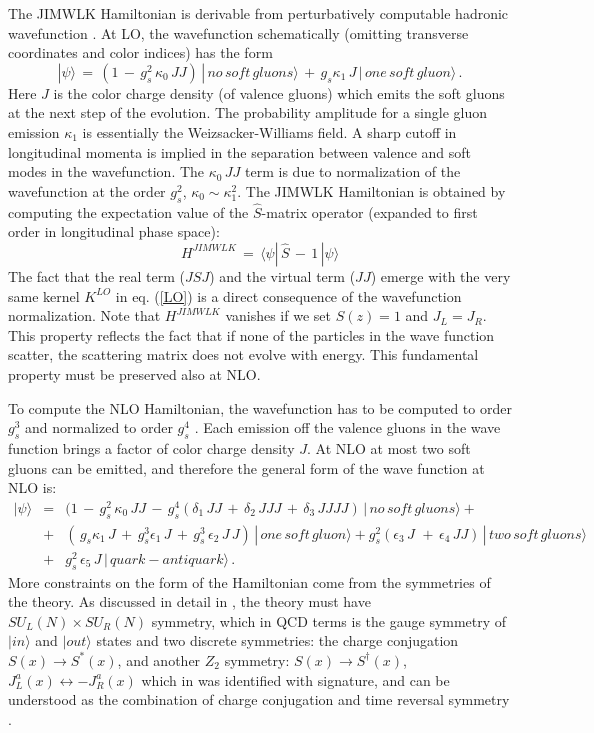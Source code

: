 \documentclass[11pt,a4paper]{article}
\def\beq{\begin{equation}}
\def\eeq{\end{equation}}
\def\beq{\begin{equation}}
\def\eeq{\end{equation}}
\begin{document}
The JIMWLK Hamiltonian is derivable from perturbatively computable hadronic wavefunction \cite{KL}. At LO, the wavefunction schematically (omitting transverse coordinates and color indices)  has the form
\beq
|\psi\rangle\,=\, (1\,-\,g_s^2\,\kappa_0\, JJ)\,|\,no\,soft\, gluons \rangle \,+\,g_s \kappa_1\,J\,|\,one\, soft \,gluon\rangle\,.
\eeq
Here $J$ is the color charge density (of valence gluons) which emits the  soft gluons at the next step of the evolution. The probability amplitude for a single gluon emission $\kappa_1$ is essentially the
Weizsacker-Williams field. A sharp cutoff in longitudinal momenta is implied in the separation between valence and soft modes in the wavefunction.
The $\kappa_0\, JJ$ term is due to normalization of the wavefunction at the order $g^2_s$, $\kappa_0\sim \kappa_1^2$.  
The JIMWLK Hamiltonian is obtained by computing the expectation value of the $\hat S$-matrix operator (expanded to first order in longitudinal phase space):
\beq
H^{JIMWLK}\,=\,\langle \psi|\, \hat S \,-\,1\,|\psi\rangle
\eeq
The fact that  the real term ($JSJ$) and the virtual term ($JJ$) emerge with the very same kernel $K^{LO}$  in eq. (\ref{LO}) is a direct consequence of the
wavefunction normalization. Note that $H^{JIMWLK}$ vanishes if we set $S(z)=1$ and $J_L=J_R$. This property reflects the fact that if none of the particles in the wave function scatter, the scattering matrix does not evolve with energy. This fundamental property must be preserved also at NLO.

To compute the NLO Hamiltonian,  the wavefunction has to be computed to order $g_s^3$ and normalized to order $g_s^4$ \cite{LM}. Each emission off the valence gluons in the wave function brings a factor of color charge density $J$. At NLO at most two soft gluons can be emitted, and therefore the general form of the wave function at NLO is:
 \begin{eqnarray}\label{psi}
|\psi\rangle&=& (1\,-\,g_s^2\,\kappa_0\, JJ\,-\,g_s^4(\delta_1\,JJ\,+\,\delta_2\,JJJ\,+\,\delta_3\,JJJJ)\,|\,no\,soft\, gluons \rangle +
\nonumber \\
&+&(\,g_s \kappa_1\,J\,+\,g_s^3\epsilon_1\, J\,+\, g_s^3\,\epsilon_2\,J \,J)\,|\,one\, soft \,gluon\rangle
+g_s^2 (\epsilon_3\, J\,\,+\,\epsilon_4\, JJ)\,|\,two\, soft \,gluons\rangle\nonumber \\
&+&g_s^2\,\epsilon_5\,J\,|\,quark-antiquark\rangle\,.
\end{eqnarray}
More constraints on the form of the Hamiltonian come from the symmetries of the theory.
As discussed in detail in \cite{reggeon}, the theory must have $SU_L(N)\times SU_R(N)$ symmetry, which in QCD terms is the gauge symmetry of $|in\rangle$ and 
$|out\rangle$ states and two discrete symmetries: the charge conjugation $S(x)\rightarrow S^*(x)$, and another $Z_2$ symmetry:  $S(x)\rightarrow S^\dagger(x)$,  $J^a_L(x)\leftrightarrow -J^a_R(x)$ which in \cite{reggeon} was identified with signature, and can be understood as the combination of charge conjugation and time reversal symmetry \cite{iancutri}.
\end{document}
